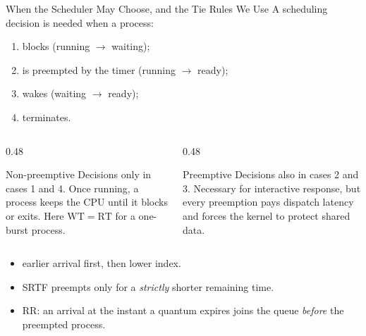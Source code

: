 \documentclass[aspectratio=169]{beamer}
\begin{document}
\begin{frame}{When the Scheduler May Choose, and the Tie Rules We Use}
  \footnotesize
  A scheduling decision is needed when a process:
  \begin{enumerate}
    \item blocks (running $\to$ waiting);
    \item is preempted by the timer (running $\to$ ready);
    \item wakes (waiting $\to$ ready);
    \item terminates.
  \end{enumerate}
  \begin{columns}[T]
    \begin{column}{0.48\textwidth}
      \begin{block}{Non-preemptive}
        Decisions only in cases 1 and 4. Once running, a process keeps the
        CPU until it blocks or exits. Here $\mathrm{WT}=\mathrm{RT}$ for a
        one-burst process.
      \end{block}
    \end{column}
    \begin{column}{0.48\textwidth}
      \begin{alertblock}{Preemptive}
        Decisions also in cases 2 and 3. Necessary for interactive response,
        but every preemption pays dispatch latency and forces the kernel to
        protect shared data.
      \end{alertblock}
    \end{column}
  \end{columns}
  \vspace{0.15cm}
  \begin{itemize}
    \item {} earlier arrival first,
      then lower index.
    \item SRTF preempts only for a \emph{strictly} shorter remaining time.
    \item RR: an arrival at the instant a quantum expires joins the queue
      \emph{before} the preempted process.
  \end{itemize}
\end{frame}
\end{document}

